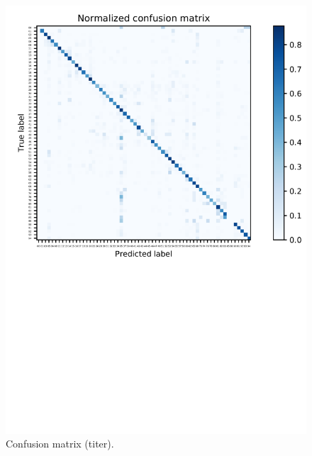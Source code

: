 \begin{figure}[h]
  \centering
  \includegraphics[width=\textwidth]{confusion.png}
  \caption{Confusion matrix (titer).}
\end{figure}

